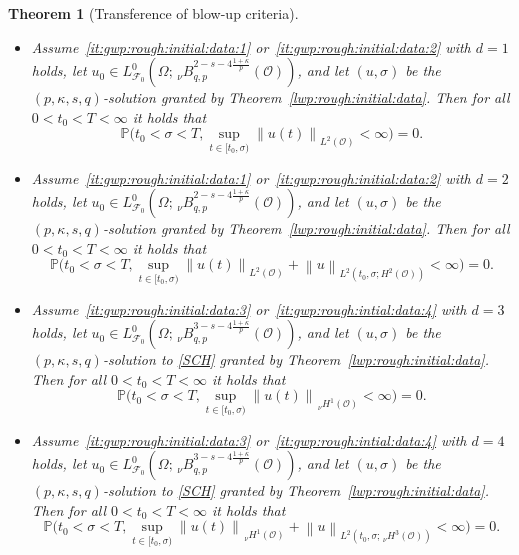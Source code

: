 \documentclass[reqno]{amsart}
\newtheorem{theorem}[Satz]{Theorem}
\newcommand{\F}{\mathscr{F}}
\renewcommand{\P}{\mathbb{P}}
\newcommand{\sO}{\mathscr{O}}
\newcommand{\1}{\mathbf{1}}
\newcommand{\nH}{\ensuremath{\,_\nu H}}
\newcommand{\bpsn}[1]{\ensuremath{\nH^{#1}(\sO)}}
\newcommand{\nrm}[1]{\left\lVert #1 \right\rVert}
\begin{document}
\begin{theorem}[Transference of blow-up criteria]
		\begin{itemize}
				\item 	Assume~\ref{it:gwp:rough:initial:data:1} or~\ref{it:gwp:rough:initial:data:2} with $d=1$ holds, let  $u_0\in L^0_{\F_0}(\Omega;\,_\nu B_{q,p}^{2-s-4\frac{1+\kappa}{p}}(\sO))$, and let $(u,\sigma)$ be the $(p,\kappa,s,q)$-solution granted by Theorem~\ref{lwp:rough:initial:data}. Then for all  $0<t_0<T<\infty$ it holds that
				\begin{equation}
				\P\bigg(t_0<\sigma<T, \sup_{t\in [t_0,\sigma)}\nrm{u(t)}_{L^2(\sO)}<\infty\bigg)=0.
				\end{equation}
                \item 	Assume~\ref{it:gwp:rough:initial:data:1} or~\ref{it:gwp:rough:initial:data:2} with $d=2$ holds, let  $u_0\in L^0_{\F_0}(\Omega; \,_\nu B_{q,p}^{2-s-4\frac{1+\kappa}{p}}(\sO))$, and let $(u,\sigma)$ be the $(p,\kappa,s,q)$-solution granted by Theorem~\ref{lwp:rough:initial:data}. Then for all  $0<t_0<T<\infty$ it holds that
				\begin{equation}
				\P\bigg(t_0<\sigma<T, \sup_{t\in [t_0,\sigma)}\nrm{u(t)}_{L^2(\sO)}+\nrm{u}_{L^2(t_0,\sigma; H^2(\sO))}<\infty\bigg)=0.
				\end{equation}
				\item Assume~\ref{it:gwp:rough:initial:data:3} or~\ref{it:gwp:rough:intial:data:4} with $d=3$  holds, let $u_0\in L^0_{\F_0}(\Omega; \,_\nu B_{q,p}^{3-s-4\frac{1+\kappa}{p}}(\sO))$, and let $(u,\sigma)$ be the $(p,\kappa,s,q)$-solution to \eqref{SCH} granted by Theorem~\ref{lwp:rough:initial:data}. Then for all $0<t_0<T<\infty$ it holds that 
				\begin{equation}
					\P\bigg(t_0<\sigma<T, \sup_{t\in [t_0,\sigma)}\nrm{u(t)}_{\bpsn{1}}<\infty\bigg)=0.
				\end{equation}
                \item Assume~\ref{it:gwp:rough:initial:data:3} or~\ref{it:gwp:rough:intial:data:4} with $d=4$ holds, let $u_0\in L^0_{\F_0}(\Omega;\,_\nu B_{q,p}^{3-s-4\frac{1+\kappa}{p}}(\sO))$, and let $(u,\sigma)$ be the $(p,\kappa,s,q)$-solution to \eqref{SCH} granted by Theorem~\ref{lwp:rough:initial:data}. Then for all $0<t_0<T<\infty$ it holds that 
				\begin{equation}
					\P\bigg(t_0<\sigma<T, \sup_{t\in [t_0,\sigma)}\nrm{u(t)}_{\bpsn{1}}+\nrm{u}_{L^2(t_0,\sigma; \bpsn{3})}<\infty\bigg)=0.
				\end{equation}
		\end{itemize}
	\end{theorem}
\end{document}
